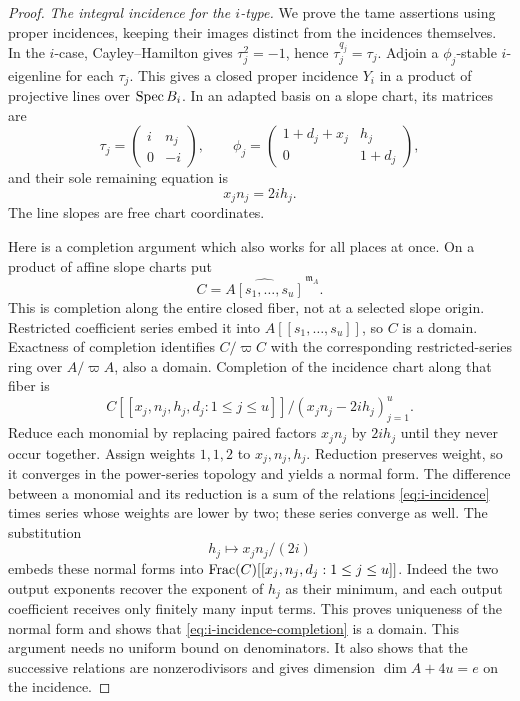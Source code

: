 \begin{proof}
\emph{The integral incidence for the \(i\)-type.}
We prove the tame assertions using proper incidences, keeping their
images distinct from the incidences themselves.  In the $i$-case,
Cayley--Hamilton gives $\tau_j^2=-1$, hence
$\tau_j^{q_j}=\tau_j$.  Adjoin a $\phi_j$-stable $i$-eigenline for
each $\tau_j$.  This gives a closed proper incidence $Y_i$ in a
product of projective lines over $\operatorname{Spec} B_i$.  In an adapted basis
on a slope chart, its matrices are
\[
\tau_j=\begin{pmatrix}i&n_j\\0&-i\end{pmatrix},\qquad
\phi_j=\begin{pmatrix}1+d_j+x_j&h_j\\0&1+d_j\end{pmatrix},
\]
and their sole remaining equation is
\begin{equation}\label{eq:i-incidence}
x_jn_j=2i h_j.
\end{equation}
The line slopes are free chart coordinates.

Here is a completion argument which also works for all places at
once.  On a product of affine slope charts put
\[
C=\widehat{A[s_1,\ldots,s_u]}^{\,\mathfrak m_A}.
\]
This is completion along the entire closed fiber, not at a selected
slope origin.  Restricted coefficient series embed it into
$A[[s_1,\ldots,s_u]]$, so $C$ is a domain.  Exactness of completion
identifies $C/\varpi C$ with the corresponding restricted-series
ring over $A/\varpi A$, also a domain.  Completion of the incidence
chart along that fiber is
\begin{equation}\label{eq:i-incidence-completion}
C[[x_j,n_j,h_j,d_j:1\le j\le u]]/
                  (x_jn_j-2ih_j)_{j=1}^u.
\end{equation}
Reduce each monomial by replacing paired factors $x_jn_j$ by
$2ih_j$ until they never occur together.  Assign weights $1,1,2$
to $x_j,n_j,h_j$.  Reduction preserves weight, so it converges in
the power-series topology and yields a normal form.  The difference
between a monomial and its reduction is a sum of the relations
\eqref{eq:i-incidence} times series whose weights are lower by two;
these series converge as well.  The
substitution
\[
h_j\longmapsto x_jn_j/(2i)
\]
embeds these normal forms into
$\operatorname{Frac}(C)[[x_j,n_j,d_j:1\le j\le u]]$.  Indeed the two output exponents
recover the exponent of $h_j$ as their minimum, and each output
coefficient receives only finitely many input terms.  This proves
uniqueness of the normal form and shows that
\eqref{eq:i-incidence-completion} is a domain.  This argument needs
no uniform bound on denominators.  It also shows that the successive
relations are nonzerodivisors and gives dimension
$\dim A+4u=e$ on the incidence.


\end{proof}

